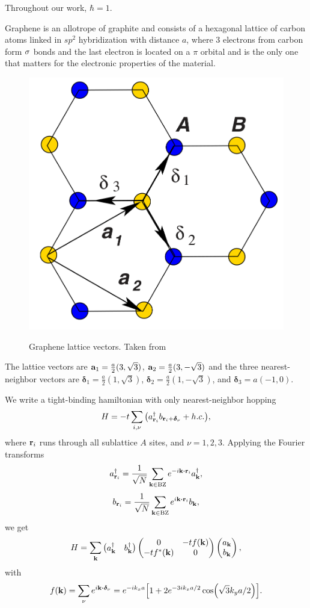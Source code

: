 \documentclass[a4paper,10pt]{article}
\begin{document}
Throughout our work, $\hbar = 1$.

\n

Graphene is an allotrope of graphite and consists of a hexagonal lattice of carbon atoms linked in $sp^2$ hybridization with distance $a$, where $3$ electrons from carbon form $\sigma$ bonds and the last electron is located on a $\pi$ orbital and is the only one that matters for the electronic properties of the material.

\begin{figure}[H]
\centering
\includegraphics[width=0.3\linewidth]{fig/graphene-lattice_vectors.png}
\label{fig:graphene-lattice_vectors}
\caption{Graphene lattice vectors. Taken from \cite{geim}}
\end{figure}

The lattice vectors are $\vb{a}_1 = \frac{a}{2} (3, \sqrt{3})$, $\vb{a}_2 = \frac{a}{2} (3, -\sqrt{3})$ and the three nearest-neighbor vectors are $\bm{\delta}_1 = \frac{a}{2} (1, \sqrt{3})$, $\bm{\delta}_2 = \frac{a}{2} (1, -\sqrt{3})$, and $\bm{\delta}_3 = a (-1, 0)$.

We write a tight-binding hamiltonian with only nearest-neighbor hopping
$$
H = -t \sum_{i,\nu} \qty(a^\dagger_{\vb{r}_i} b_{\vb{r}_i + \bm{\delta}_\nu} + h.c. ),
$$
where $\vb{r}_i$ runs through all sublattice $A$ sites, and $\nu = 1, 2, 3$. Applying the Fourier transforms
$$
a_{\r_i}^\d = \frac{1}{\sqrt{N}} \sum_{\k \in \text{BZ}} e^{-i \k \vdot \r_i} a_{\k}^\d,
$$
$$
b_{\r_i} = \frac{1}{\sqrt{N}} \sum_{\k \in \text{BZ}} e^{i \k \vdot \r_i} b_{\k},
$$
we get
$$
H = \sum_{\vb{k}}
\begin{pmatrix}
a_{\vb{k}}^\dagger & b_{\vb{k}}^\dagger
\end{pmatrix}
\begin{pmatrix}
0 & -t f(\vb{k}) \\
-t f^*(\vb{k}) & 0
\end{pmatrix}
\begin{pmatrix}
a_{\vb{k}} \\ b_{\vb{k}}
\end{pmatrix},
$$
with
$$
f(\k) = \sum_{\nu} e^{i \k \vdot \bm{\delta}_\nu} =
e^{-i k_x a} \qty[ 1 + 2 e^{-3ik_x a / 2} \cos(\sqrt{3} k_y a / 2) ].
$$
\end{document}
